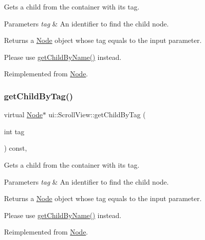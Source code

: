 Gets a child from the container with its tag.


\begin{DoxyParams}{Parameters}
{\em tag} & An identifier to find the child node.\\
\hline
\end{DoxyParams}
\begin{DoxyReturn}{Returns}
a \hyperlink{classNode}{Node} object whose tag equals to the input parameter.
\end{DoxyReturn}
Please use {\ttfamily \hyperlink{classui_1_1ScrollView_a9750342974b85647eac63dc49db4292f}{get\+Child\+By\+Name()}} instead. 

Reimplemented from \hyperlink{classNode_a8eebd018aa7ebebb674d1649e1a79cac}{Node}.

\mbox{\label{classui_1_1ScrollView_a0b4781b276e8040776a7ec93eb54792e}} 
\subsubsection{\texorpdfstring{get\+Child\+By\+Tag()}{getChildByTag()}\hspace{0.1cm}{\footnotesize\ttfamily [2/2]}}
{\footnotesize\ttfamily virtual \hyperlink{classNode}{Node}$\ast$ ui\+::\+Scroll\+View\+::get\+Child\+By\+Tag (\begin{DoxyParamCaption}\item[{int}]{tag }\end{DoxyParamCaption}) const\hspace{0.3cm}{\ttfamily [override]}, {\ttfamily [virtual]}}

Gets a child from the container with its tag.


\begin{DoxyParams}{Parameters}
{\em tag} & An identifier to find the child node.\\
\hline
\end{DoxyParams}
\begin{DoxyReturn}{Returns}
a \hyperlink{classNode}{Node} object whose tag equals to the input parameter.
\end{DoxyReturn}
Please use {\ttfamily \hyperlink{classui_1_1ScrollView_a9750342974b85647eac63dc49db4292f}{get\+Child\+By\+Name()}} instead. 

Reimplemented from \hyperlink{classNode_a8eebd018aa7ebebb674d1649e1a79cac}{Node}.

